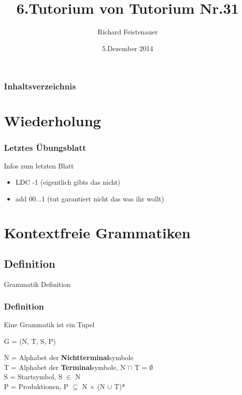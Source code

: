 \documentclass{beamer}
\author{Richard Feistenauer}
\title{6.Tutorium von Tutorium Nr.31}
\date{5.Dezember 2014}
\begin{document}
\begin {frame}
	\titlepage
\end {frame}

\begin {frame}
	\frametitle {Inhaltsverzeichnis}
	\tableofcontents
\end {frame}

\section{Wiederholung}
\begin{frame}
	\frametitle{Letztes \"Ubungsblatt}
	\begin{block}{Infos zum letzten Blatt}
		\begin{itemize}
			\item LDC -1 (eigentlich gibts das nicht)
			\item add 00...1 (tut garantiert nicht das was ihr wollt)
		\end{itemize}
	\end{block}		
\end{frame}

\section{Kontextfreie Grammatiken}
\subsection[Definition]{Definition}
\begin{frame}
	\begin{block}{Grammatik Definition}
		\frametitle{Definition}
			Eine Grammatik ist ein Tupel
		\pause
		\begin{center}
			G = (N, T, S, P)
		\end{center}
	\end{block}
	\pause
	\begin{block}{ }
		N = Alphabet der \textbf{Nichtterminal}symbole \\
		T = Alphabet der \textbf{Terminal}symbole, N $\cap$ T 		= $\emptyset$ \\
		S = Startsymbol, S $\in$ N \\
		P = Produktionen, P $\subseteq$ N $\times$ (N $\cup$ 			T)*
	\end{block}
\end{frame}
\end{document}
